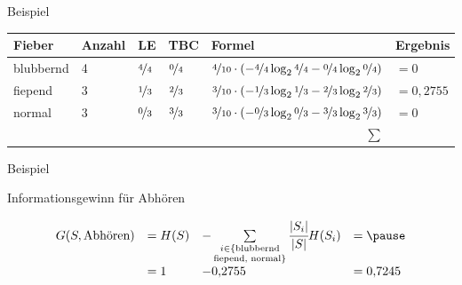 \begin{frame}{Beispiel}
\begin{tabular}{| l<{\onslide<2->} | l<{\onslide<3->} | l<{\onslide<5->} | l<{\onslide<6->} | l<{\onslide<7->} | l<{\onslide} |}\hline 
\textbf{\textcolor{ohmred}{Fieber}} & \textbf{Anzahl} & \textbf{LE} & \textbf{TBC} & \textbf{Formel} & \textbf{Ergebnis} \\ \hline 
blubbernd & 4 & $ \nicefrac{4}{4}$ & $ \nicefrac{0}{4}$ & $ \nicefrac{4}{10} \cdot \left(- \nicefrac{4}{4} \log_2 \nicefrac{4}{4} - \nicefrac{0}{4} \log_2 \nicefrac{0}{4} \right)$ & $=0$\\ \hline 
fiepend & 3 & $ \nicefrac{1}{3}$ & $\nicefrac{2}{3}$ & $ \nicefrac{3}{10} \cdot \left(- \nicefrac{1}{3} \log_2 \nicefrac{1}{3} - \nicefrac{2}{3} \log_2 \nicefrac{2}{3} \right)$ & $=0{,}2755$\\ \hline 
normal & 3 & $\nicefrac{0}{3}$ & $\nicefrac{3}{3}$ & $\nicefrac{3}{10} \cdot \left(- \nicefrac{0}{3} \log_2 \nicefrac{0}{3} - \nicefrac{3}{3} \log_2 \nicefrac{3}{3} \right)$ & $=0$\\ \hline 
\multicolumn{5}{r|}{$\boldsymbol{\sum}$} & \onslide<8->{$0{,}2755$} \\ \cline{6-6}
\end{tabular}


\end{frame}


\begin{frame}{Beispiel}

Informationsgewinn für Abhören

\[
\begin{array}{r l l l}
    G(S, \text{Abhören}) &= H(S) &- \sum\limits_{\substack{i \in \{\text{blubbernd} \\ \text{fiepend, normal}\}}} \cfrac{|S_i|}{|S|}H(S_i) &= \pause \\[1em]
    &= 1 &-0{,}2755 &= 0{,}7245 
\end{array}
\]

\end{frame}



